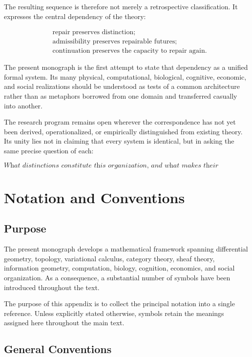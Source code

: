 \documentclass[11pt,oneside]{book}
\numberwithin{equation}{chapter}
\theoremstyle{definition}
\theoremstyle{plain}
\begin{document}
The resulting sequence is therefore not merely a retrospective
classification. It expresses the central dependency of the theory:

\[
\boxed{
\begin{aligned}
&\text{repair preserves distinction;}\\
&\text{admissibility preserves repairable futures;}\\
&\text{continuation preserves the capacity to repair again}.
\end{aligned}
}
\]

The present monograph is the first attempt to state that dependency as a
unified formal system. Its many physical, computational, biological,
cognitive, economic, and social realizations should be understood as tests
of a common architecture rather than as metaphors borrowed from one domain
and transferred casually into another.

The research program remains open wherever the correspondence has not yet
been derived, operationalized, or empirically distinguished from existing
theory. Its unity lies not in claiming that every system is identical, but
in asking the same precise question of each:

\[
\textit{What distinctions constitute this organization, and what makes
their continuation possible?}
\]

\chapter{Notation and Conventions}

\section{Purpose}

The present monograph develops a mathematical framework spanning
differential geometry, topology, variational calculus, category theory,
sheaf theory, information geometry, computation, biology, cognition,
economics, and social organization. As a consequence, a substantial
number of symbols have been introduced throughout the text.

The purpose of this appendix is to collect the principal notation into a
single reference. Unless explicitly stated otherwise, symbols retain the
meanings assigned here throughout the main text.

\section{General Conventions}
\end{document}
